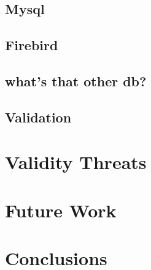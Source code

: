 \documentclass[times, 10pt,twocolumn]{article}
\begin{document}
\subsection{Mysql}
\subsection{Firebird}
\subsection{ what's that other db?}
\subsection{Validation}
\section{Validity Threats}
\section{ Future Work}
\section{Conclusions}




\end{document}
